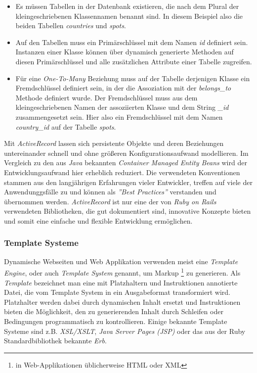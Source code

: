 \begin{itemize}
\item Es müssen Tabellen in der Datenbank existieren, die nach dem
  Plural der kleingeschriebenen Klassennamen benannt sind. In diesem
  Beispiel also die beiden Tabellen \textit{countries} und
  \textit{spots}.
\item Auf den Tabellen muss ein Primärschlüssel mit dem Namen
  \textit{id} definiert sein. Instanzen einer Klasse können über
  dynamisch generierte Methoden auf diesen Primärschlüssel und alle
  zusätzlichen Attribute einer Tabelle zugreifen.
\item Für eine \textit{One-To-Many} Beziehung muss auf der Tabelle
  derjenigen Klasse ein Fremdschlüssel definiert sein, in der die
  Assoziation mit der \textit{belongs\_to} Methode definiert
  wurde. Der Fremdschlüssel muss aus dem kleingeschriebenen Namen der
  assoziierten Klasse und dem String \textit{\_id} zusammengesetzt
  sein. Hier also ein Fremdschlüssel mit dem Namen
  \textit{country\_id} auf der Tabelle \textit{spots}.
\end{itemize}

Mit \textit{ActiveRecord} lassen sich persistente Objekte und deren
Beziehungen untereinander schnell und ohne größeren
Konfigurationsaufwand modellieren. Im Vergleich zu den aus
\textit{Java} bekannten \textit{Container Managed Entity Beans} wird
der Entwicklungsaufwand hier erheblich reduziert. Die verwendeten
Konventionen stammen aus den langjährigen Erfahrungen vieler
Entwickler, treffen auf viele der Anwendunggsfälle zu und können als
\textit{''Best Practices''} verstanden und über\-nommen
werden. \textit{ActiveRecord} ist nur eine der von \textit{Ruby on
  Rails} verwendeten Bibliotheken, die gut dokumentiert sind,
innovative Konzepte bieten und somit eine einfache und flexible
Entwicklung ermöglichen.

\subsubsection{Template Systeme}

Dynamische Webseiten und Web Applikation verwenden meist eine
\textit{Template Engine}, oder auch \textit{Template System} genannt,
um Markup \footnote{in Web-Applikationen üblicherweise HTML oder XML}
zu generieren. Als \textit{Template} bezeichnet man eine mit
Platzhaltern und Instruktionen annotierte Datei, die vom Template
System in ein Ausgabeformat transformiert wird. Platzhalter werden
dabei durch dynamischen Inhalt ersetzt und Instruktionen bieten die
Möglichkeit, den zu generierenden Inhalt durch Schleifen oder
Bedingungen programmatisch zu kontrollieren. Einige bekannte Template
Systeme sind z.B. \textit{XSL/XSLT}, \textit{Java Server Pages (JSP)}
oder das aus der Ruby Standardbibliothek bekannte \textit{Erb}.

